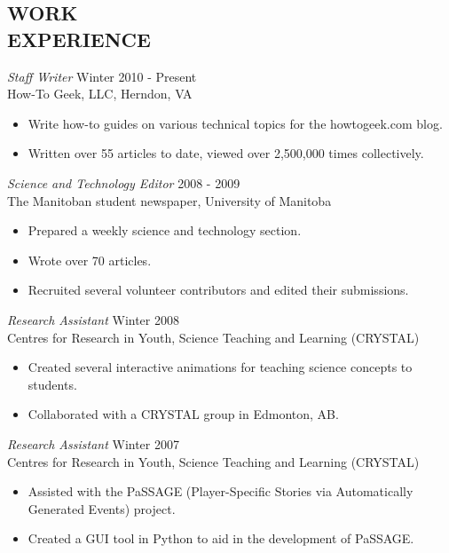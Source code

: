 \documentclass[line,margin]{res}
\begin{document}
\begin{resume}
\section{WORK \\EXPERIENCE}
  {\sl Staff Writer} \hfill Winter 2010 - Present \\
  How-To Geek, LLC, Herndon, VA
  \begin{itemize}  \itemsep -2pt %
    \item Write how-to guides on various technical topics for the howtogeek.com blog.
    \item Written over 55 articles to date, viewed over 2,500,000 times collectively.
  \end{itemize}
  
  {\sl Science and Technology Editor} \hfill 2008 - 2009 \\
  The Manitoban student newspaper, University of Manitoba
  \begin{itemize}  \itemsep -2pt %
    \item Prepared a weekly science and technology section.
    \item Wrote over 70 articles.
    \item Recruited several volunteer contributors and edited their submissions.
  \end{itemize}
  
  {\sl Research Assistant} \hfill Winter 2008 \\
  Centres for Research in Youth, Science Teaching and Learning (CRYSTAL)
  \begin{itemize}  \itemsep -2pt %
    \item Created several interactive animations for teaching science concepts to students.
    \item Collaborated with a CRYSTAL group in Edmonton, AB.
  \end{itemize}
  
  {\sl Research Assistant} \hfill Winter 2007 \\
  Centres for Research in Youth, Science Teaching and Learning (CRYSTAL)
  \begin{itemize}  \itemsep -2pt %
    \item Assisted with the PaSSAGE (Player-Specific Stories via Automatically Generated Events) project.
    \item Created a GUI tool in Python to aid in the development of PaSSAGE.
  \end{itemize}


\end{resume}
\end{document}

